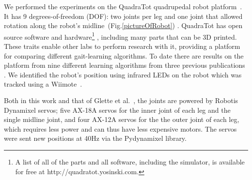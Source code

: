 We performed the experiments on the QuadraTot quadrupedal robot platform~\cite{yos:clune}.
It has 9 degrees-of-freedom (DOF): two joints per leg and one joint that allowed rotation along the robot's midline~(Fig.\ref{pictureOfRobot}) . %
QuadraTot has open source software and hardware\footnote{A list of all of the parts and all software, including the simulator, is available for free at http://quadratot.yosinski.com.} %
, including many parts that can be 3D printed. These traits enable other labs to perform research with it, providing a platform for comparing different gait-learning algorithms. 
To date there are results on the platform from nine different learning algorithms from three previous publications \cite{yos:clune,glette,haocheng}. We identified the robot's position using infrared LEDs on the robot which was tracked using a Wiimote~\cite{yos:clune}.

Both in this work and that of Glette et al.~\cite{glette}, the joints are powered by Robotis Dynamixel servos; five AX-18A servos for the inner joint of each leg and the single midline joint, and four AX-12A servos for the the outer joint of each leg, which requires less power and can thus have less expensive motors. The servos were sent new positions at 40Hz via the Pydynamixel library. 

